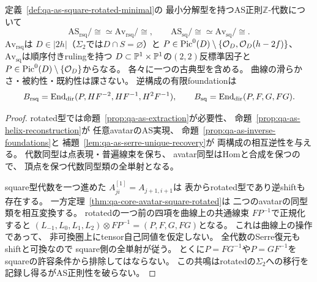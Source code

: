 \begin{theorem}
\label{thm:qa-as-avatar-bijection}
定義~\ref{def:qa-as-square-rotated-minimal}の
最小分解型を持つAS正則$\mathbb Z$-代数について
\begin{equation}
\mathrm{AS}_{\mathrm{rsq}}/\cong\simeq
 \mathrm{Av}_{\mathrm{rsq}}/\cong,\qquad
\mathrm{AS}_{\mathrm{sq}}/\cong\simeq
 \mathrm{Av}_{\mathrm{sq}}/\cong .
\label{eq:qa-as-avatar-two-bijections}
\end{equation}
$\mathrm{Av}_{\mathrm{rsq}}$は
$D\in|2h|$（$\Sigma_2$では$D\cap S=\varnothing$）と
$P\in\operatorname{Pic}^0(D)\setminus\{\mathcal O_D,\mathcal O_D(h-2f)\}$、
$\mathrm{Av}_{\mathrm{sq}}$は順序付きrulingを持つ
$D\subset\mathbb P^1\times\mathbb P^1$の$(2,2)$反標準因子と
$P\in\operatorname{Pic}^0(D)\setminus\{\mathcal O_D\}$からなる。
各々に一つの古典型を含める。
曲線の滑らかさ・被約性・既約性は課さない。
逆構成の有限foundationは
\[
B_{\mathrm{rsq}}=\operatorname{End}_{\mathrm{dir}}(P,HF^{-2},HF^{-1},H^2F^{-1}),
\qquad
B_{\mathrm{sq}}=\operatorname{End}_{\mathrm{dir}}(P,F,G,FG).
\]
\end{theorem}
\begin{proof}
rotated型では命題~\ref{prop:qa-as-extraction}が必要性、
命題~\ref{prop:qa-as-helix-reconstruction}が
任意avatarのAS実現、
命題~\ref{prop:qa-as-inverse-foundations}と
補題~\ref{lem:qa-as-serre-unique-recovery}が
両構成の相互逆性を与える。
代数同型は点表現・普遍線束を保ち、
avatar同型はHomと合成を保つので、
頂点を保つ代数同型類の全単射となる。

square型代数を一つ進めた
$A^{[1]}_{ji}=A_{j+1,i+1}$は
表からrotated型であり逆shiftも存在する。
一方定理~\ref{thm:qa-core-avatar-square-rotated}は
二つのavatarの同型類を相互変換する。
rotatedの一つ前の四項を曲線上の共通線束
$FP^{-1}$で正規化すると
$(L_{-1},L_0,L_1,L_2)\otimes FP^{-1}
=(P,F,G,FG)$となる。
これは曲線上の操作であって、
非可換圏上にtensor自己同値を仮定しない。
全代数のSerre復元もshiftと可換なので
square側の全単射が従う。
とくに$P=FG^{-1}$や$P=GF^{-1}$を
squareの許容条件から排除してはならない。
この共鳴はrotatedの$\Sigma_2$への移行を
記録し得るがAS正則性を破らない。
\end{proof}

